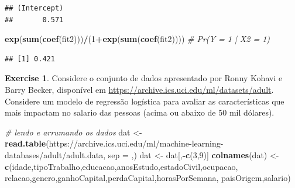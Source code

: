 \documentclass[
]{book}
\newenvironment{Shaded}{\begin{snugshade}}{\end{snugshade}}
\newcommand{\CommentTok}[1]{\textcolor[rgb]{0.56,0.35,0.01}{\textit{#1}}}
\newcommand{\DataTypeTok}[1]{\textcolor[rgb]{0.13,0.29,0.53}{#1}}
\newcommand{\DecValTok}[1]{\textcolor[rgb]{0.00,0.00,0.81}{#1}}
\newcommand{\KeywordTok}[1]{\textcolor[rgb]{0.13,0.29,0.53}{\textbf{#1}}}
\newcommand{\NormalTok}[1]{#1}
\newcommand{\OperatorTok}[1]{\textcolor[rgb]{0.81,0.36,0.00}{\textbf{#1}}}
\newcommand{\StringTok}[1]{\textcolor[rgb]{0.31,0.60,0.02}{#1}}
\theoremstyle{definition}
\theoremstyle{definition}
\theoremstyle{definition}
\newtheorem{exercise}{Exercise}[chapter]
\theoremstyle{remark}
\begin{document}
\begin{verbatim}
## (Intercept) 
##       0.571
\end{verbatim}

\begin{Shaded}
\begin{Highlighting}[]
\KeywordTok{exp}\NormalTok{(}\KeywordTok{sum}\NormalTok{(}\KeywordTok{coef}\NormalTok{(fit2)))}\OperatorTok{/}\NormalTok{(}\DecValTok{1}\OperatorTok{+}\KeywordTok{exp}\NormalTok{(}\KeywordTok{sum}\NormalTok{(}\KeywordTok{coef}\NormalTok{(fit2)))) }\CommentTok{\# Pr(Y = 1 | X2 = 1)}
\end{Highlighting}
\end{Shaded}

\begin{verbatim}
## [1] 0.421
\end{verbatim}

\begin{exercise}
\protect\hypertarget{exr:unnamed-chunk-141}{}{\label{exr:unnamed-chunk-141} }Considere o conjunto de dados apresentado por Ronny Kohavi e Barry Becker, disponível em \url{https://archive.ics.uci.edu/ml/datasets/adult}. Considere um modelo de regressão logística para avaliar as características que mais impactam no salario das pessoas (acima ou abaixo de 50 mil dólares).
\end{exercise}

\begin{Shaded}
\begin{Highlighting}[]
\CommentTok{\# lendo e arrumando os dados}
\NormalTok{dat \textless{}{-}}\StringTok{ }\KeywordTok{read.table}\NormalTok{(}\StringTok{\textquotesingle{}https://archive.ics.uci.edu/ml/machine{-}learning{-}databases/adult/adult.data\textquotesingle{}}\NormalTok{,}
                  \DataTypeTok{sep =} \StringTok{\textquotesingle{},\textquotesingle{}}\NormalTok{)}
\NormalTok{dat \textless{}{-}}\StringTok{ }\NormalTok{dat[,}\OperatorTok{{-}}\KeywordTok{c}\NormalTok{(}\DecValTok{3}\NormalTok{,}\DecValTok{9}\NormalTok{)]}
\KeywordTok{colnames}\NormalTok{(dat) \textless{}{-}}\StringTok{ }\KeywordTok{c}\NormalTok{(}\StringTok{\textquotesingle{}idade\textquotesingle{}}\NormalTok{,}\StringTok{\textquotesingle{}tipoTrabalho\textquotesingle{}}\NormalTok{,}\StringTok{\textquotesingle{}educacao\textquotesingle{}}\NormalTok{,}\StringTok{\textquotesingle{}anosEstudo\textquotesingle{}}\NormalTok{,}\StringTok{\textquotesingle{}estadoCivil\textquotesingle{}}\NormalTok{,}\StringTok{\textquotesingle{}ocupacao\textquotesingle{}}\NormalTok{,}
                   \StringTok{\textquotesingle{}relacao\textquotesingle{}}\NormalTok{,}\StringTok{\textquotesingle{}genero\textquotesingle{}}\NormalTok{,}\StringTok{\textquotesingle{}ganhoCapital\textquotesingle{}}\NormalTok{,}\StringTok{\textquotesingle{}perdaCapital\textquotesingle{}}\NormalTok{,}\StringTok{\textquotesingle{}horasPorSemana\textquotesingle{}}\NormalTok{,}
                   \StringTok{\textquotesingle{}paisOrigem\textquotesingle{}}\NormalTok{,}\StringTok{\textquotesingle{}salario\textquotesingle{}}\NormalTok{)}
\end{Highlighting}
\end{Shaded}
\end{document}
